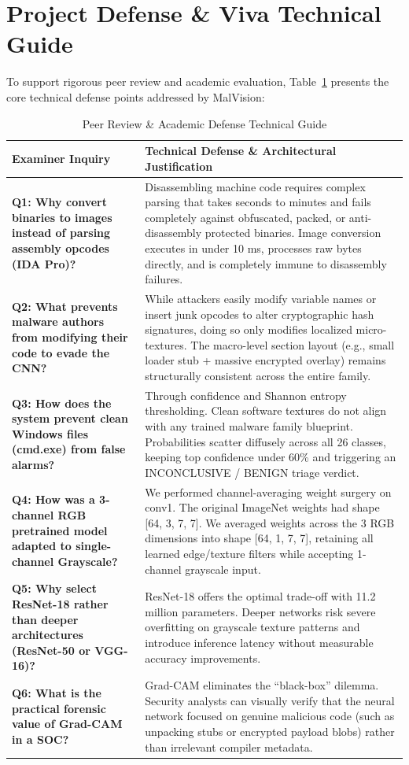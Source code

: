 \documentclass[journal,10pt,twocolumn]{IEEEtran}
\begin{document}
\section{Project Defense \& Viva Technical Guide}
To support rigorous peer review and academic evaluation, Table~\ref{tab:viva} presents the core technical defense points addressed by MalVision:

\begin{table}[!t]
\caption{Peer Review \& Academic Defense Technical Guide\label{tab:viva}}
\centering
\begin{tabular}{p{}p{}}
\toprule
\textbf{Examiner Inquiry} & \textbf{Technical Defense \& Architectural Justification} \\
\midrule
\textbf{Q1: Why convert binaries to images instead of parsing assembly opcodes (IDA Pro)?} & Disassembling machine code requires complex parsing that takes seconds to minutes and fails completely against obfuscated, packed, or anti-disassembly protected binaries. Image conversion executes in under 10 ms, processes raw bytes directly, and is completely immune to disassembly failures. \\
\midrule
\textbf{Q2: What prevents malware authors from modifying their code to evade the CNN?} & While attackers easily modify variable names or insert junk opcodes to alter cryptographic hash signatures, doing so only modifies localized micro-textures. The macro-level section layout (e.g., small loader stub + massive encrypted overlay) remains structurally consistent across the entire family. \\
\midrule
\textbf{Q3: How does the system prevent clean Windows files (cmd.exe) from false alarms?} & Through confidence and Shannon entropy thresholding. Clean software textures do not align with any trained malware family blueprint. Probabilities scatter diffusely across all 26 classes, keeping top confidence under 60\% and triggering an INCONCLUSIVE / BENIGN triage verdict. \\
\midrule
\textbf{Q4: How was a 3-channel RGB pretrained model adapted to single-channel Grayscale?} & We performed channel-averaging weight surgery on conv1. The original ImageNet weights had shape [64, 3, 7, 7]. We averaged weights across the 3 RGB dimensions into shape [64, 1, 7, 7], retaining all learned edge/texture filters while accepting 1-channel grayscale input. \\
\midrule
\textbf{Q5: Why select ResNet-18 rather than deeper architectures (ResNet-50 or VGG-16)?} & ResNet-18 offers the optimal trade-off with 11.2 million parameters. Deeper networks risk severe overfitting on grayscale texture patterns and introduce inference latency without measurable accuracy improvements. \\
\midrule
\textbf{Q6: What is the practical forensic value of Grad-CAM in a SOC?} & Grad-CAM eliminates the ``black-box'' dilemma. Security analysts can visually verify that the neural network focused on genuine malicious code (such as unpacking stubs or encrypted payload blobs) rather than irrelevant compiler metadata. \\
\bottomrule
\end{tabular}
\end{table}
\end{document}
